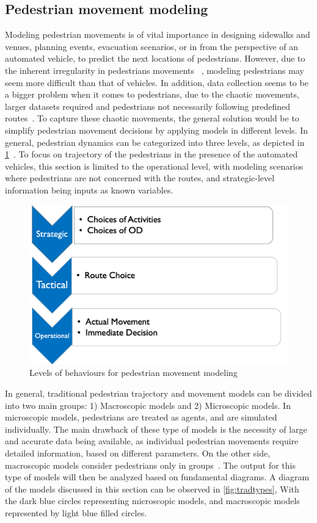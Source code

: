\subsection{Pedestrian movement modeling}
Modeling pedestrian movements is of vital importance in designing sidewalks and venues, planning events, evacuation scenarios, or in from the perspective of an automated vehicle, to predict the next locations of pedestrians. However, due to the inherent irregularity in pedestrians movements~ \cite{bierlaire2003behavioral}, modeling pedestrians may seem more difficult than that of vehicles. In addition, data collection seems to be a bigger problem when it comes to pedestrians, due to the chaotic movements, larger datasets required and pedestrians not necessarily following predefined routes~\cite{danalet2014bayesian}. To capture these chaotic movements, the general solution would be to simplify pedestrian movement decisions by applying models in different levels. In general, pedestrian dynamics can be categorized into three levels, as depicted in \cref{fig:model levels}~\cite{sahaleh2012scenario}. To focus on trajectory of the pedestrians in the presence of the automated vehicles, this section is limited to the operational level, with modeling scenarios where pedestrians are not concerned with the routes, and strategic-level information being inputs as known variables.
\begin{figure}
    \centering
    \includegraphics[scale=0.6]{chapter_1b/figures/ped-levels.png}
    \caption{Levels of behaviours for pedestrian movement modeling}
    \label{fig:model levels}
\end{figure}
In general, traditional pedestrian trajectory and movement models can be divided into two main groups: 1) Macroscopic models and 2) Microscopic models. In microscopic models, pedestrians are treated as agents, and are simulated individually. The main drawback of these type of models is the necessity of large and accurate data being available, as individual pedestrian movements require detailed information, based on different parameters. On the other side, macroscopic models consider pedestrians only in groups~\cite{sahaleh2012scenario}. The output for this type of models will then be analyzed based on fundamental diagrams. A diagram of the models discussed in this section can be observed in \cref{fig:tradtypes}, With the dark blue circles representing microscopic models, and macroscopic models represented by light blue filled circles.
